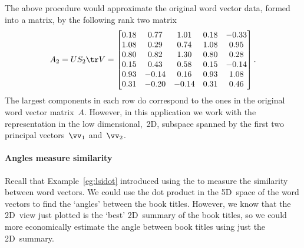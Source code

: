 The above procedure would approximate the original word vector data, formed into a matrix, by the following rank two matrix \twodp
\begin{equation*}
A_2=US_2\tr V
=\begin{bmatrix} 0.18&0.77&1.01&0.18&-0.33
\\1.08&0.29&0.74&1.08&0.95
\\0.80&0.82&1.30&0.80&0.28
\\0.15&0.43&0.58&0.15&-0.14
\\0.93&-0.14&0.16&0.93&1.08
\\0.31&-0.20&-0.14&0.31&0.46 \end{bmatrix}.
\end{equation*}
The largest components in each row do correspond to the ones in the original word vector matrix~\(A\).
However, in this application we work with the representation in the low dimensional,~2D, subspace spanned by the first two principal vectors~\(\vv_1\) and~\(\vv_2\).


\paragraph{Angles measure similarity}
Recall that Example~\ref{eg:lsidot} introduced using the  to measure the similarity between word vectors.
We could use the dot product in the 5D~space of the word vectors to find the `angles' between the book titles.
However, we know that the 2D~view just plotted is the `best' 2D~summary of the book titles, so we could more economically estimate the angle between book titles using just the 2D~summary.

